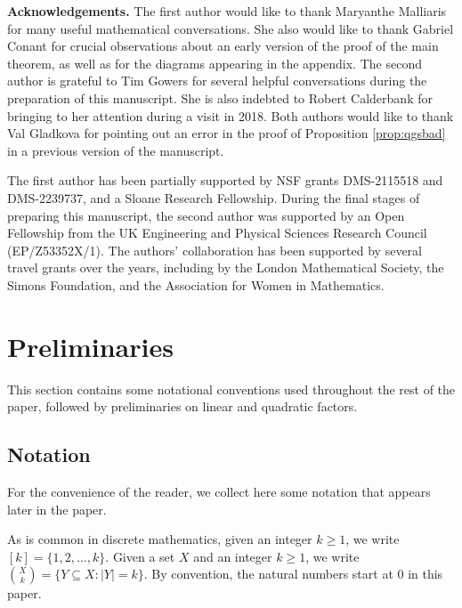 \documentclass[12pt,oneside,british,a4wide]{amsart}
\numberwithin{equation}{section}
\theoremstyle{definition}
\begin{document}
\medskip

\textbf{Acknowledgements.} The first author would like to thank Maryanthe Malliaris for many useful mathematical conversations.  She also would like to thank Gabriel Conant for crucial observations about an early version of the proof of the main theorem, as well as for the diagrams appearing in the appendix. The second author is grateful to Tim Gowers for several helpful conversations during the preparation of this manuscript. She is also indebted to Robert Calderbank for bringing \cite{Delsarte.1975} to her attention during a visit in 2018. Both authors would like to thank Val Gladkova for pointing out an error in the proof of Proposition \ref{prop:qgsbad} in a previous version of the manuscript.

The first author has been partially supported by NSF grants DMS-2115518 and DMS-2239737, and a Sloane Research Fellowship. During the final stages of preparing this manuscript, the second author was supported by an Open Fellowship from the UK Engineering and Physical Sciences Research Council (EP/Z53352X/1). The authors' collaboration has been supported by several travel grants over the years, including by the London Mathematical Society, the Simons Foundation, and the Association for Women in Mathematics. 



\section{Preliminaries}\label{sec:fourierreview}

This section contains some notational conventions used throughout the rest of the paper, followed by preliminaries on linear and quadratic factors.

\subsection{Notation}

For the convenience of the reader, we collect here some notation that appears later in the paper. 

As is common in discrete mathematics, given an integer $k\geq 1$, we write $[k]=\{1,2,\dots,k\}$. Given a set $X$ and an integer $k\geq 1$, we write ${X\choose k}=\{Y\subseteq X: |Y|=k\}$.  By convention, the natural numbers start at $0$ in this paper.
\end{document}
